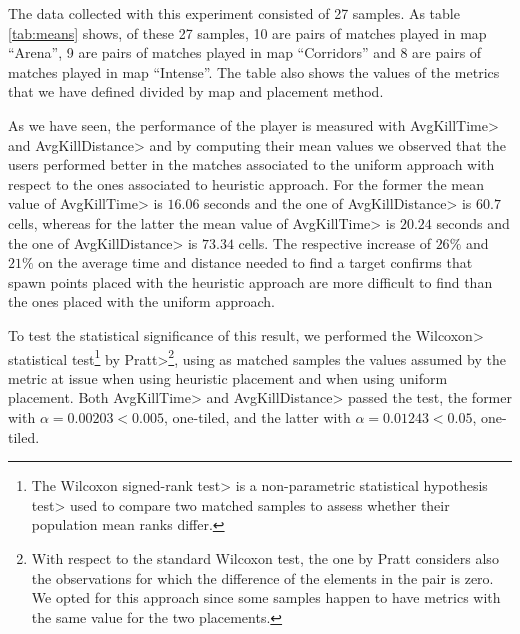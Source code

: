 The data collected with this experiment consisted of 27 samples. As table \ref{tab:means} shows, of these 27 samples, 10 are pairs of matches played in map ``Arena'', 9 are pairs of matches played in map ``Corridors'' and 8 are pairs of matches played in map ``Intense''. The table also shows the values of the metrics that we have defined divided by map and placement method.

\par

As we have seen, the performance of the player is measured with \<AvgKillTime> and \<AvgKillDistance> and by computing their mean values we observed that the users performed better in the matches associated to the uniform approach with respect to the ones associated to heuristic approach. For the former the mean value of \<AvgKillTime> is $16.06$ seconds and the one of \<AvgKillDistance> is $60.7$ cells, whereas for the latter the mean value of \<AvgKillTime> is $20.24$ seconds and the one of \<AvgKillDistance> is $73.34$ cells. The respective increase of $26\%$ and $21\%$ on the average time and distance needed to find a target confirms that spawn points placed with the heuristic approach are more difficult to find than the ones placed with the uniform approach.

\par

To test the statistical significance of this result, we performed the \<Wilcoxon> statistical test\footnote{The \<Wilcoxon signed-rank test> is a \<non-parametric statistical hypothesis test> used to compare two matched samples to assess whether their population mean ranks differ.} by \<Pratt>\footnote{With respect to the standard Wilcoxon test, the one by Pratt considers also the observations for which the difference of the elements in the pair is zero. We opted for this approach since some samples happen to have metrics with the same value for the two placements.}, using as matched samples the values assumed by the metric at issue when using heuristic placement and when using uniform placement. Both \<AvgKillTime> and  \<AvgKillDistance> passed the test, the former with $\alpha = 0.00203 < 0.005$, one-tiled, and the latter with $\alpha = 0.01243 < 0.05$, one-tiled.

